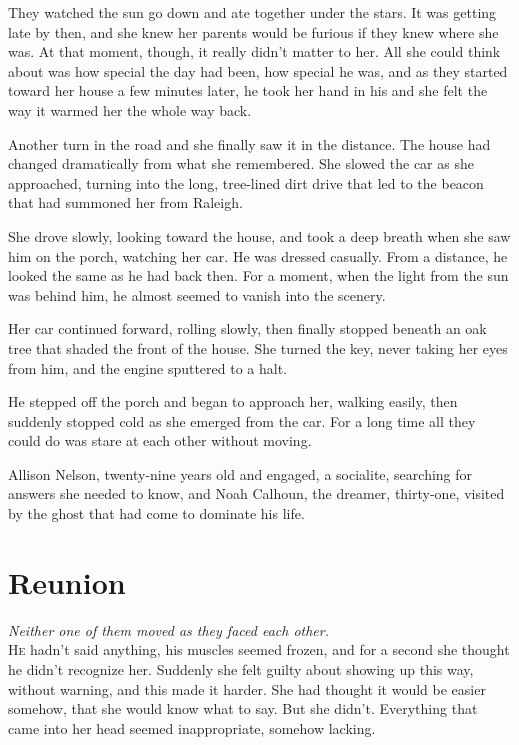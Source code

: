 \documentclass[10pt, twoside, openright]{book}
\newcommand{\chapterornament}[1]{\def\currentornament{#1}}
\def\currentornament{}
\begin{document}
They watched the sun go down and ate together under the stars. It was
getting late by then, and she knew her parents would be furious if they
knew where she was. At that moment, though, it really didn't matter to
her. All she could think about was how special the day had been, how
special he was, and as they started toward her house a few minutes
later, he took her hand in his and she felt the way it warmed her the
whole way back.

Another turn in the road and she finally saw it in the distance. The
house had changed dramatically from what she remembered. She slowed the
car as she approached, turning into the long, tree-lined dirt drive that
led to the beacon that had summoned her from Raleigh.

She drove slowly, looking toward the house, and took a deep breath when
she saw him on the porch, watching her car. He was dressed casually.
From a distance, he looked the same as he had back then. For a moment,
when the light from the sun was behind him, he almost seemed to vanish
into the scenery.

Her car continued forward, rolling slowly, then finally stopp\-ed beneath
an oak tree that shaded the front of the house. She turned the key,
never taking her eyes from him, and the engine sputtered to a halt.

He stepped off the porch and began to approach her, walking easily, then
suddenly stopped cold as she emerged from the car. For a long time all
they could do was stare at each other without moving.

Allison Nelson, twenty-nine years old and engaged, a socialite,
searching for answers she needed to know, and Noah Calhoun, the dreamer,
thirty-one, visited by the ghost that had come to dominate his life.

		\newpage
\thispagestyle{empty}
\clearpage
\null
\chapterornament{89}
\chapter{Reunion}


\noindent\textit{Neither one of them moved as they faced each other.}\\

\lettrine[findent=0.7em, nindent=0.0em]{H}{e} hadn't said anything, his muscles seemed frozen, and for a second she
thought he didn't recognize her. Suddenly she felt guilty about showing
up this way, without warning, and this made it harder. She had thought
it would be easier somehow, that she would know what to say. But she
didn't. Everything that came into her head seemed inappropriate, somehow
lacking.
\end{document}
